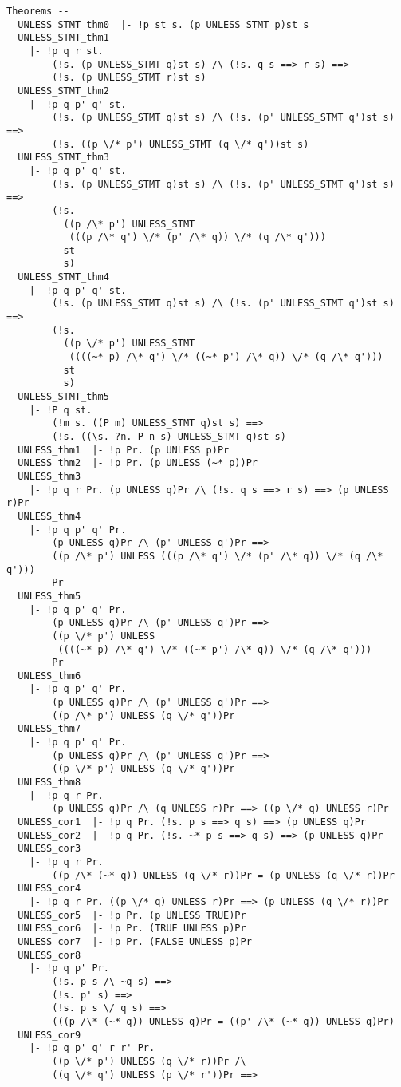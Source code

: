 {\begin{verbatim}
Theorems --
  UNLESS_STMT_thm0  |- !p st s. (p UNLESS_STMT p)st s
  UNLESS_STMT_thm1
    |- !p q r st.
        (!s. (p UNLESS_STMT q)st s) /\ (!s. q s ==> r s) ==>
        (!s. (p UNLESS_STMT r)st s)
  UNLESS_STMT_thm2
    |- !p q p' q' st.
        (!s. (p UNLESS_STMT q)st s) /\ (!s. (p' UNLESS_STMT q')st s) ==>
        (!s. ((p \/* p') UNLESS_STMT (q \/* q'))st s)
  UNLESS_STMT_thm3
    |- !p q p' q' st.
        (!s. (p UNLESS_STMT q)st s) /\ (!s. (p' UNLESS_STMT q')st s) ==>
        (!s.
          ((p /\* p') UNLESS_STMT
           (((p /\* q') \/* (p' /\* q)) \/* (q /\* q')))
          st 
          s)
  UNLESS_STMT_thm4
    |- !p q p' q' st.
        (!s. (p UNLESS_STMT q)st s) /\ (!s. (p' UNLESS_STMT q')st s) ==>
        (!s.
          ((p \/* p') UNLESS_STMT
           ((((~* p) /\* q') \/* ((~* p') /\* q)) \/* (q /\* q')))
          st 
          s)
  UNLESS_STMT_thm5
    |- !P q st.
        (!m s. ((P m) UNLESS_STMT q)st s) ==>
        (!s. ((\s. ?n. P n s) UNLESS_STMT q)st s)
  UNLESS_thm1  |- !p Pr. (p UNLESS p)Pr
  UNLESS_thm2  |- !p Pr. (p UNLESS (~* p))Pr
  UNLESS_thm3
    |- !p q r Pr. (p UNLESS q)Pr /\ (!s. q s ==> r s) ==> (p UNLESS r)Pr
  UNLESS_thm4
    |- !p q p' q' Pr.
        (p UNLESS q)Pr /\ (p' UNLESS q')Pr ==>
        ((p /\* p') UNLESS (((p /\* q') \/* (p' /\* q)) \/* (q /\* q')))
        Pr
  UNLESS_thm5
    |- !p q p' q' Pr.
        (p UNLESS q)Pr /\ (p' UNLESS q')Pr ==>
        ((p \/* p') UNLESS
         ((((~* p) /\* q') \/* ((~* p') /\* q)) \/* (q /\* q')))
        Pr
  UNLESS_thm6
    |- !p q p' q' Pr.
        (p UNLESS q)Pr /\ (p' UNLESS q')Pr ==>
        ((p /\* p') UNLESS (q \/* q'))Pr
  UNLESS_thm7
    |- !p q p' q' Pr.
        (p UNLESS q)Pr /\ (p' UNLESS q')Pr ==>
        ((p \/* p') UNLESS (q \/* q'))Pr
  UNLESS_thm8
    |- !p q r Pr.
        (p UNLESS q)Pr /\ (q UNLESS r)Pr ==> ((p \/* q) UNLESS r)Pr
  UNLESS_cor1  |- !p q Pr. (!s. p s ==> q s) ==> (p UNLESS q)Pr
  UNLESS_cor2  |- !p q Pr. (!s. ~* p s ==> q s) ==> (p UNLESS q)Pr
  UNLESS_cor3
    |- !p q r Pr.
        ((p /\* (~* q)) UNLESS (q \/* r))Pr = (p UNLESS (q \/* r))Pr
  UNLESS_cor4
    |- !p q r Pr. ((p \/* q) UNLESS r)Pr ==> (p UNLESS (q \/* r))Pr
  UNLESS_cor5  |- !p Pr. (p UNLESS TRUE)Pr
  UNLESS_cor6  |- !p Pr. (TRUE UNLESS p)Pr
  UNLESS_cor7  |- !p Pr. (FALSE UNLESS p)Pr
  UNLESS_cor8
    |- !p q p' Pr.
        (!s. p s /\ ~q s) ==>
        (!s. p' s) ==>
        (!s. p s \/ q s) ==>
        (((p /\* (~* q)) UNLESS q)Pr = ((p' /\* (~* q)) UNLESS q)Pr)
  UNLESS_cor9
    |- !p q p' q' r r' Pr.
        ((p \/* p') UNLESS (q \/* r))Pr /\
        ((q \/* q') UNLESS (p \/* r'))Pr ==>

\end{verbatim}}
